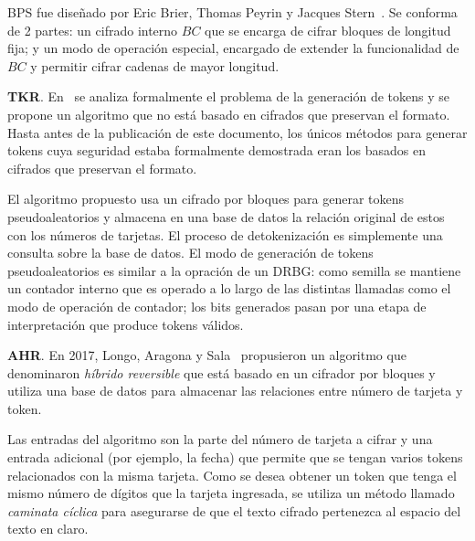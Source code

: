 BPS fue diseñado por Eric Brier, Thomas Peyrin y Jacques Stern~\cite{bps}. Se
conforma de 2 partes: un cifrado interno $BC$ que se encarga de cifrar bloques
de longitud fija; y un modo de operación especial, encargado de extender la
funcionalidad de $BC$ y permitir cifrar cadenas de mayor longitud.


\textbf{TKR}. En~\cite{doc_sandra} se analiza formalmente el problema de la
generación de tokens y se propone un algoritmo que no está basado en cifrados
que preservan el formato. Hasta antes de la publicación de este documento, los
únicos métodos para generar tokens cuya seguridad estaba formalmente demostrada
eran los basados en cifrados que preservan el formato.

El algoritmo propuesto usa un cifrado por bloques para generar tokens
pseudoaleatorios y almacena en una base de datos la relación original de estos
con los números de tarjetas. El proceso de detokenización es simplemente una
consulta sobre la base de datos. El modo de generación de tokens
pseudoaleatorios es similar a la opración de un DRBG: como semilla se mantiene
un contador interno que es operado a lo largo de las distintas llamadas como el
modo de operación de contador; los bits generados pasan por una etapa de
interpretación que produce tokens válidos.

\textbf{AHR}. En 2017, Longo, Aragona y Sala~\cite{aragona} propusieron un
algoritmo que denominaron \textit{híbrido reversible} que está basado en un
cifrador por bloques y utiliza una base de datos para almacenar las relaciones
entre número de tarjeta y token.

Las entradas del algoritmo son la parte del número de tarjeta a cifrar y una
entrada adicional (por ejemplo, la fecha) que permite que se tengan varios
tokens relacionados con la misma tarjeta. Como se desea obtener un token que
tenga el mismo número de dígitos que la tarjeta ingresada, se utiliza un método
llamado \textit{caminata cíclica} para asegurarse de que el texto cifrado
pertenezca al espacio del texto en claro.

